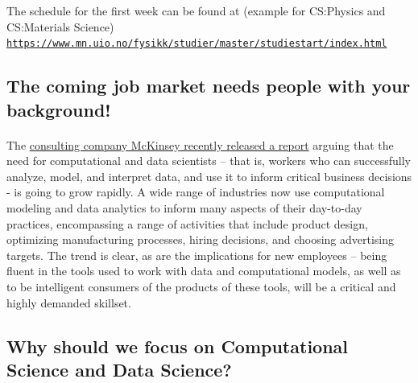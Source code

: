 \documentclass[%
oneside,                 %
final,                   %
10pt]{article}
\begin{document}
The schedule for the first week can be found at (example for CS:Physics and CS:Materials Science) \href{{https://www.mn.uio.no/fysikk/studier/master/studiestart/index.html}}{\nolinkurl{https://www.mn.uio.no/fysikk/studier/master/studiestart/index.html}}



\subsection{The coming job market needs people with your background!}

\paragraph{}
The \href{{https://www.mckinsey.com/business-functions/mckinsey-analytics/our-insights/the-age-of-analytics-competing-in-a-data-driven-world}}{consulting company McKinsey recently released a report} arguing that the need for computational and data scientists – that is,
workers who can successfully analyze, model, and interpret data, and use it to inform critical business
decisions - is going to grow rapidly. A wide range of industries now use computational
modeling and data analytics to inform many aspects of their day-to-day practices, encompassing
a range of activities that include product design, optimizing manufacturing processes, hiring decisions,
and choosing advertising targets. The trend is clear, as are the implications for new employees
– being fluent in the tools used to work with data and computational models, as well as to be
intelligent consumers of the products of these tools, will be a critical and highly  demanded skillset.



\subsection{Why should we focus on Computational Science and Data Science?}

\end{document}

